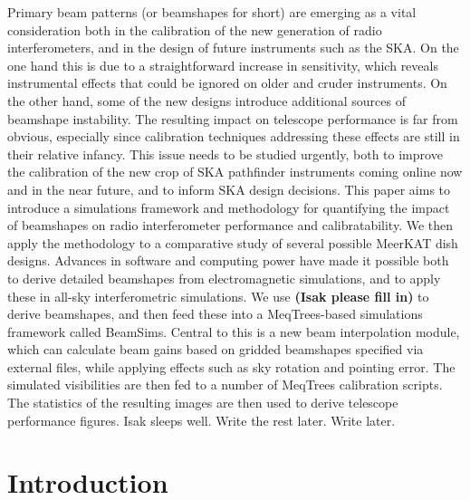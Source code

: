\documentclass{aa}
\begin{document}
\abstract%
{Primary beam patterns (or beamshapes for short) are emerging as a vital consideration both in the calibration of the new generation of radio interferometers, and in the design of future instruments such as the SKA. On the one hand this is due to a straightforward increase in sensitivity, which reveals instrumental effects that could be ignored on older and cruder instruments. On the other hand, some of the new designs introduce additional sources of beamshape instability. The resulting impact on telescope performance is far from obvious, especially since calibration techniques addressing these effects are still in their relative infancy. This issue needs to be studied urgently, both to improve the calibration of the new crop of SKA pathfinder instruments coming online now and in the near future, and to inform SKA design decisions.}
{This paper aims to introduce a simulations framework and methodology for quantifying the impact of beamshapes on radio interferometer performance and calibratability. We then apply the methodology to a comparative study of several possible MeerKAT dish designs.}
{Advances in software and computing power have made it possible both to derive detailed beamshapes from electromagnetic simulations, and to apply these in all-sky interferometric simulations. We use {{\bf (Isak please fill in)}} to derive beamshapes, and then feed these into a MeqTrees-based simulations framework called BeamSims. Central to this is a new beam interpolation module, which can calculate beam gains based on gridded beamshapes specified via external files, while
applying effects such as sky rotation and pointing error. The simulated visibilities are then fed to a number of MeqTrees calibration scripts. The statistics of the resulting images are then used to derive telescope performance figures.}
{Isak sleeps well. Write the rest later.}
{Write later.}


\maketitle

\section{Introduction}
\end{document}
